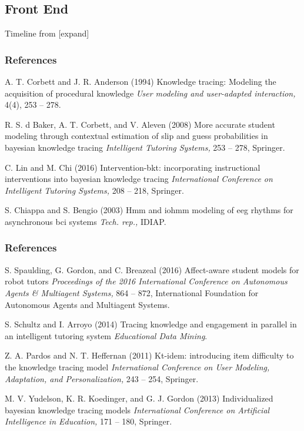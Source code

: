\documentclass{beamer}
\begin{document}
\subsection{Front End}
\begin{frame}{Timeline from [expand]}

\end{frame}

\begin{frame}
\frametitle{References}
\begin{footnotesize}
	\begin{thebibliography}{99}
		 A. T. Corbett and J. R. Anderson (1994)
		\newblock Knowledge tracing: Modeling the acquisition of procedural knowledge
		\newblock \emph{User modeling and user-adapted interaction,} 4(4), 253 -- 278.
		
		 R. S. d Baker, A. T. Corbett, and V. Aleven (2008)
		\newblock More accurate student modeling through contextual estimation of slip and guess probabilities in bayesian knowledge tracing
		\newblock \emph{Intelligent Tutoring Systems,} 253 -- 278, Springer.
		
		 C. Lin and M. Chi (2016)
		\newblock Intervention-bkt: incorporating instructional interventions into bayesian knowledge tracing
		\newblock \emph{International Conference on Intelligent Tutoring Systems,} 208 -- 218, Springer.
		
		 S. Chiappa and S. Bengio (2003)
		\newblock Hmm and iohmm modeling of eeg rhythms
for asynchronous bci systems
		\newblock \emph{Tech. rep.,} IDIAP.
	\end{thebibliography}
\end{footnotesize}
\end{frame}

\begin{frame}
\frametitle{References}
\begin{footnotesize}
	\begin{thebibliography}{99}
		 S. Spaulding, G. Gordon, and C. Breazeal (2016)
		\newblock Affect-aware student models for robot tutors
		\newblock \emph{Proceedings of the 2016 International Conference on Autonomous Agents \& Multiagent Systems,} 864 -- 872, International
Foundation for Autonomous Agents and Multiagent Systems.
		
		 S. Schultz and I. Arroyo (2014)
		\newblock Tracing knowledge and engagement in parallel in an intelligent tutoring system
		\newblock \emph{Educational Data Mining}.
		
		 Z. A. Pardos and N. T. Heffernan (2011)
		\newblock Kt-idem: introducing item difficulty to the knowledge tracing model
		\newblock \emph{International Conference on User Modeling, Adaptation, and Personalization,} 243 -- 254, Springer.
		
		 M. V. Yudelson, K. R. Koedinger, and G. J. Gordon (2013)
		\newblock Individualized bayesian knowledge tracing models
		\newblock \emph{International Conference on Artificial Intelligence in Education,} 171 -- 180, Springer.
	\end{thebibliography}
\end{footnotesize}
\end{frame}
\end{document}
